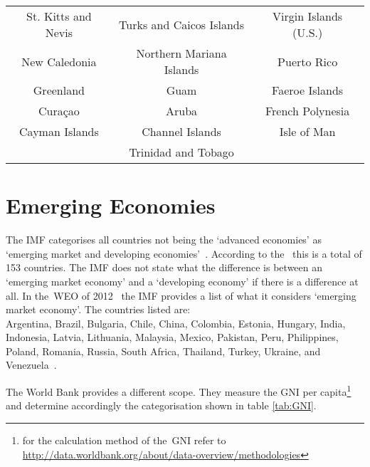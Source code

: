 \begin{table}
\begin{tabular}{ccc}
St. Kitts and Nevis &Turks and Caicos Islands&Virgin Islands (U.S.)\\
New Caledonia	   &Northern Mariana Islands&Puerto Rico\\
Greenland           &Guam                    &Faeroe Islands\\
Curaçao             &Aruba          &French Polynesia\\
Cayman Islands     &Channel Islands         &Isle of Man\\
    &Trinidad and Tobago              &\\
\bottomrule
 \end{tabular}
\end{table}


\section{Emerging Economies}

The IMF categorises all countries not being the `advanced economies' as `emerging market and developing economies'~\cite{InternationalMonetaryFund:2013vn}.
According to the~\cite{InternationalMonetaryFund:2013vn} this is a total of 153 countries.
The IMF does not state what the difference is between an `emerging market economy' and a `developing economy' if there is a difference at all.
In the~\gls{WEO} of 2012~\cite{InternationalMonetaryFund:2012tz} the IMF provides a list of what it considers `emerging market economy'.
The countries listed are:\\
Argentina, Brazil, Bulgaria, Chile, China, Colombia, Estonia, Hungary,
India, Indonesia, Latvia, Lithuania, Malaysia, Mexico, Pakistan, Peru,
Philippines, Poland, Romania, Russia, South Africa, Thailand, Turkey,
Ukraine, and Venezuela~\cite{IMF:2012}.


The World Bank provides a different scope. 
They measure the \gls{GNI} per capita\footnote{for the calculation method of the~\gls{GNI} refer to \url{http://data.worldbank.org/about/data-overview/methodologies}} and determine accordingly the categorisation shown in table \ref{tab:GNI}.



